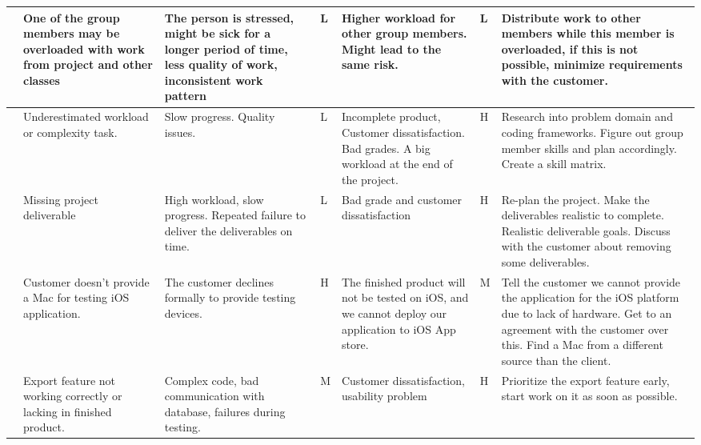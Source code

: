 \begin{landscape}
\begin{longtable}{| p{0.4cm} | p{4cm} | p{4cm} | p{2cm} | p{4cm} | p{1cm} | p{4cm} |}
	\stepcounter{riskId}
	\centering
		\arabic{riskId} &
		One of the group members may be overloaded with work from project and other
		classes &
		The person is stressed, might be sick for a longer period of time, less
		quality of work, inconsistent work pattern &
		\centering L &
		Higher workload for other group members. Might lead to the same risk. &
		\centering  L & Distribute work to other members while this member is
		overloaded, if this is not possible, minimize requirements with the
		customer. \\
	\hline

	\stepcounter{riskId}
	\centering
		\arabic{riskId} &
        Underestimated workload or complexity task. &
		Slow progress. Quality issues. &
		\centering  L &
		Incomplete product, Customer dissatisfaction. Bad grades. A big
		workload at the end of the project. &
		\centering  H &
		Research into problem domain and coding frameworks. Figure out
		group member skills and plan accordingly. Create a skill matrix. \\
	\hline

	\stepcounter{riskId}
	\centering
		\arabic{riskId} &
        Missing project deliverable &
		High workload, slow progress. Repeated failure to deliver the
		deliverables on time. &
		\centering  L &
		Bad grade and customer dissatisfaction &
		\centering H &
		Re-plan the project. Make the deliverables realistic to complete.
		Realistic deliverable goals. Discuss with the customer about removing
		some deliverables. \\
	\hline

	\stepcounter{riskId}
	\centering
		\arabic{riskId} &
        Customer doesn’t provide a Mac for testing iOS application. &
        The customer declines formally to provide testing devices.
		& \centering H &
		The finished product will not be tested on iOS, and we cannot deploy
		our application to iOS App store. &
        
		\centering  M &
		Tell the customer we cannot provide the application for the iOS
		platform due to lack of hardware. Get to an agreement with the customer
		over this. Find a Mac from a different source than the client. \\
	\hline

	\stepcounter{riskId}
	\centering
		\arabic{riskId} &
		Export feature not working correctly or lacking in finished product. &
		Complex code, bad communication with database, failures during
		testing. &
		\centering  M &
		Customer dissatisfaction, usability problem &
		\centering H &
		Prioritize the export feature early, start work on it as soon as
		possible. \\
	\hline


\end{longtable}
\end{landscape}
